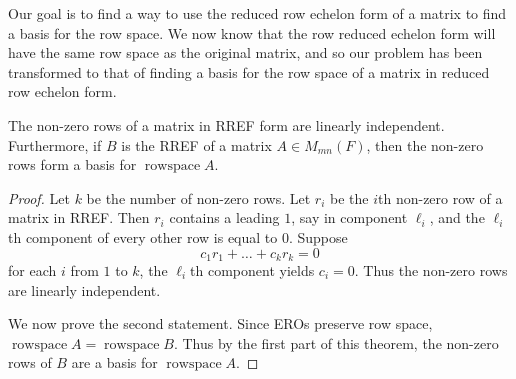 \documentclass{article}
\DeclareMathOperator{\rowspace}{rowspace}
\begin{document}
\begin{remark}
  Our goal is to find a way to use the reduced row echelon form of a matrix to find
  a basis for the row space. We now know that the row reduced echelon form will
  have the same row space as the original matrix, and so our problem has been
  transformed to that of finding a basis for the row space of a matrix in reduced
  row echelon form.
\end{remark}
\begin{theorem}
  The non-zero rows of a matrix in RREF form are linearly independent. Furthermore, if $B$ is the RREF
  of a matrix $A \in M_{mn}(F)$, then the non-zero rows form a basis for $\rowspace A$.
\end{theorem}
\begin{proof}
  Let $k$ be the number of non-zero rows. Let $r_i$ be the $i$th non-zero row of a matrix in RREF. Then $r_i$ contains a leading $1$, say in component $\ell_i$, and the $\ell_i$th component of every other row is equal to $0$. Suppose
  \[
    c_1r_1 + \dots + c_kr_k = 0
  \]
  for each $i$ from $1$ to $k$, the $\ell_i$th component yields $c_i = 0$. Thus the non-zero rows are linearly independent.

  We now prove the second statement. Since EROs preserve row space, $\rowspace A = \rowspace B$. Thus by the first part of this theorem, the non-zero rows of $B$ are a basis for $\rowspace A$.
\end{proof}
\end{document}

